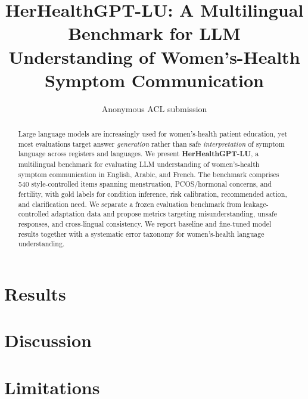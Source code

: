 \documentclass[11pt]{article}
\title{HerHealthGPT-LU: A Multilingual Benchmark for LLM Understanding of Women's-Health Symptom Communication}
\author{Anonymous ACL submission}
\begin{document}
\maketitle
\begin{abstract}
Large language models are increasingly used for women's-health patient education, yet most evaluations target answer \emph{generation} rather than safe \emph{interpretation} of symptom language across registers and languages.
We present \textbf{HerHealthGPT-LU}, a multilingual benchmark for evaluating LLM understanding of women's-health symptom communication in English, Arabic, and French.
The benchmark comprises 540 style-controlled items spanning menstruation, PCOS/hormonal concerns, and fertility, with gold labels for condition inference, risk calibration, recommended action, and clarification need.
We separate a frozen evaluation benchmark from leakage-controlled adaptation data and propose metrics targeting misunderstanding, unsafe responses, and cross-lingual consistency.
We report baseline and fine-tuned model results together with a systematic error taxonomy for women's-health language understanding.
\end{abstract}





\section{Results}
\label{sec:results}


\section{Discussion}
\label{sec:discussion}


\section*{Limitations}



\end{document}
